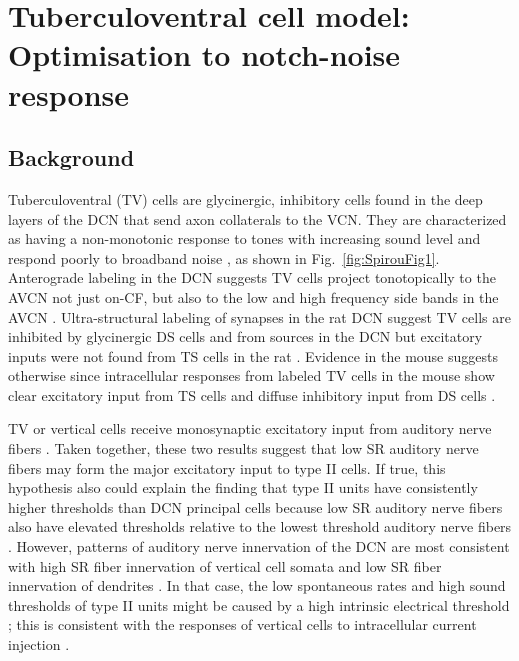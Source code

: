 
\graphicspath{{./gfx/}{../figures/}{/media/data/Work/cnstellate/}{/media/data/Work/cnstellate/TV_Notch/}{/media/data/Work/Responses/}{/media/data/Work/thesis/ans2010/gfx/}}
\newpage
\section[TV Cell Model]{Tuberculoventral cell model: Optimisation to notch-noise response}
\label{sec:TV-cell-model}

\subsection{Background}

Tuberculoventral (TV) cells are glycinergic, inhibitory cells found in the deep
layers of the DCN that send axon collaterals to the VCN\@. They are
characterized as having a non-monotonic response to tones with increasing sound
level and respond poorly to broadband noise
\citep{SpirouDavisEtAl:1999,NelkenYoung:1997,ReissYoung:2005}, as shown in
Fig.~\ref{fig:SpirouFig1}.  Anterograde labeling in the DCN suggests TV cells
project tonotopically to the AVCN not just on-CF, but also to the low and high
frequency side bands in the AVCN
\citep{MunirathinamOstapoffEtAl:2004,OstapoffMorestEtAl:1999}.  Ultra-structural
labeling of synapses in the rat DCN suggest TV cells are inhibited by
glycinergic DS cells and from sources in the DCN but excitatory inputs were not
found from TS cells in the rat \citep{Rubio:2005}. Evidence in the mouse
suggests otherwise since intracellular responses from labeled TV cells in the
mouse show clear excitatory input from TS cells and diffuse inhibitory input
from DS cells \citep{ZhangOertel:1993b,WickesbergOertel:1993}.

\medskip{} 

TV or vertical cells receive monosynaptic excitatory input from auditory nerve
ﬁbers \citep{OertelWu:1989}\citep{ZhangOertel:1993b}. Taken together, these two
results suggest that low SR auditory nerve ﬁbers may form the major excitatory
input to type II cells. If true, this hypothesis also could explain the ﬁnding
that type II units have consistently higher thresholds than DCN principal cells
\citep{YoungBrownell:1976} because low SR auditory nerve ﬁbers also have
elevated thresholds relative to the lowest threshold auditory nerve ﬁbers
\citep{Liberman:1978}. However, patterns of auditory nerve innervation of the
DCN are most consistent with high SR ﬁber innervation of vertical cell somata
and low SR ﬁber innervation of dendrites \citep{Liberman:1993}. In that case,
the low spontaneous rates and high sound thresholds of type II units might be
caused by a high intrinsic electrical threshold \citep{HancockDavisEtAl:1997};
this is consistent with the responses of vertical cells to intracellular current
injection \citep{DingVoigt:1997,ZhangOertel:1993b}.


